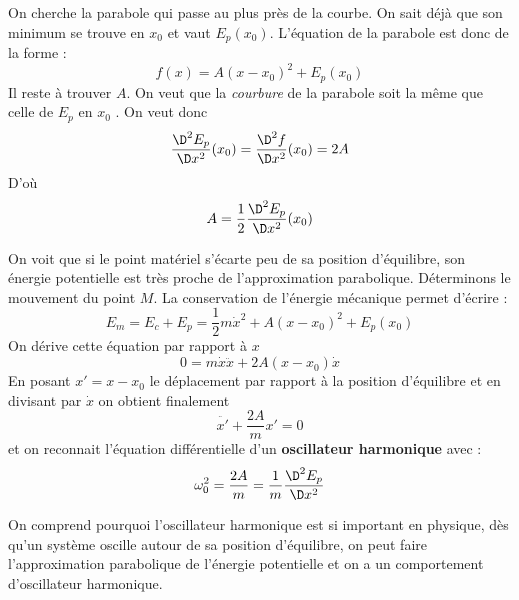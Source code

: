 \documentclass{cours}
\begin{document}
On cherche la parabole qui passe au plus près de la courbe. On sait déjà que son minimum se trouve en $x_0$ et vaut $E_p(x_0)$. L'équation de la parabole est donc de la forme :
\begin{equation}
f(x) = A(x-x_0)^2 + E_p(x_0)
\end{equation}
Il reste à trouver $A$. On veut que la \emph{courbure} de la parabole soit la même que celle de $E_p$ en $x_0$ . On veut donc 
\begin{equation}
\frac{\D^2 E_p}{\D x^2}(x_0) = \frac{\D^2 f}{\D x^2}(x_0) = 2A
\end{equation}
D'où 
\begin{equation}
A = \frac{1}{2}\frac{\D^2 E_p}{\D x^2}(x_0)
\end{equation}
 
On voit que si le point matériel s'écarte peu de sa position d'équilibre, son énergie potentielle est très proche de l'approximation parabolique. Déterminons le mouvement du point $M$. La conservation de l'énergie mécanique permet d'écrire :
\begin{equation}
E_m = E_c + E_p = \frac{1}{2}m \dot{x}^2 + A(x-x_0)^2 + E_p(x_0)
\end{equation}
On dérive cette équation par rapport à $x$
\begin{equation}
0 = m \dot{x} \ddot{x} + 2A(x-x_0)\dot{x} 
\end{equation}
En posant $x' = x-x_0$ le déplacement par rapport à la position d'équilibre et en divisant par $\dot{x}$ on obtient finalement
\begin{equation}
\ddot{x'} + \frac{2A}{m}x' = 0
\end{equation}
et on reconnait l'équation différentielle d'un \textbf{oscillateur harmonique} avec :
\begin{equation}
\omega_0^2 = \frac{2A}{m} = \frac{1}{m} \frac{\D^2 E_p}{\D x^2}
\end{equation}

On comprend pourquoi l'oscillateur harmonique est si important en physique, dès qu'un système oscille autour de sa position d'équilibre, on peut faire l'approximation parabolique de l'énergie potentielle et on a un comportement d'oscillateur harmonique.
\end{document}
